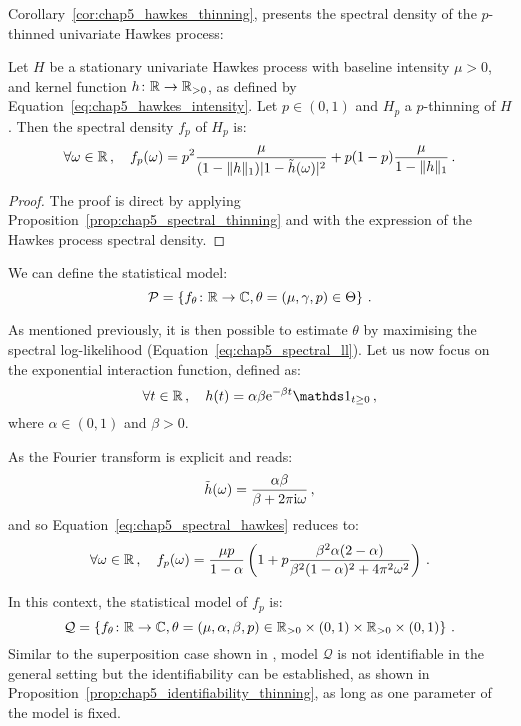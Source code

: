     Corollary~\ref{cor:chap5_hawkes_thinning}, presents the spectral density of the $p$-thinned univariate Hawkes process:

    \begin{corollary}\label{cor:chap5_hawkes_thinning}
        Let $H$ be a stationary univariate Hawkes process with baseline intensity $\mu > 0$, and kernel function $h\colon {\mathbb R}\to {\mathbb R}_{>0}$,
        as defined by Equation~\eqref{eq:chap5_hawkes_intensity}. Let $p\in(0,1)$ and $H_p$ a $p$-thinning of $H$. 
        Then the spectral density $f_p$ of $H_p$ is:
        \begin{equation}\label{eq:chap5_spectral_hawkes}
            \forall \omega \in {\mathbb R}\,, \quad f_p(\omega) = p^2 \frac{\mu}{(1-\|h\|_1)|1-\tilde h(\omega)|^2} + p(1-p)\frac{\mu}{1-\|h\|_1}\,.
        \end{equation}
    \end{corollary}
    \begin{proof}
        The proof is direct by applying Proposition~\ref{prop:chap5_spectral_thinning} and 
        with the expression of the Hawkes process spectral density.
    \end{proof}
    We can define the statistical model:
    \[\mathcal{P} = 
      \left\{
        f_\theta \colon {\mathbb R} \to {\mathbb C}, \theta = (\mu, \gamma, p) \in \Theta
      \right\}\,.
    \]

    As mentioned previously, it is then possible to estimate $\theta$ by maximising the spectral log-likelihood (Equation~\eqref{eq:chap5_spectral_ll}).
    Let us now focus on the exponential interaction function, defined as:
    \[\forall t\in\RR\,,\quad h(t) = \alpha \beta \mathrm{e}^{-\beta t}\II_{t\geq 0}\,,\]
    where $\alpha \in(0,1)$ and $\beta > 0$.

    As the Fourier transform is explicit and reads:
    \[\tilde h (\omega) = \frac{\alpha \beta}{\beta + 2 \pi \mathrm{i} \omega}\,,\]
    and so Equation~\eqref{eq:chap5_spectral_hawkes} reduces to:
    \begin{equation}\label{eq:chap5_spectral_exponential}
        \forall \omega\in{\mathbb R}\,,\quad
        f_p(\omega) = \frac{\mu p }{1-\alpha}\left(1 + p \frac{\beta^2 \alpha (2-\alpha)}{\beta^2(1-\alpha)^2 + 4 \pi^2 \omega^2}\right)\,.
    \end{equation}

    In this context, the statistical model of $f_p$ is:
    \[\mathcal{Q} = 
      \left\{
        f_\theta \colon {\mathbb R} \to {\mathbb C}, 
        \theta = (\mu, \alpha, \beta, p) \in {\mathbb R}_{>0}\times (0,1) \times {\mathbb R}_{>0}\times(0,1)
      \right\}\,.
    \]
    Similar to the superposition case shown in \textcite[Proposition 3.2]{Bonnet2024}, 
    model $\mathcal{Q}$ is not identifiable in the general setting but the identifiability can be established, as shown in Proposition~\ref{prop:chap5_identifiability_thinning}, as long as one parameter of the model is fixed.

